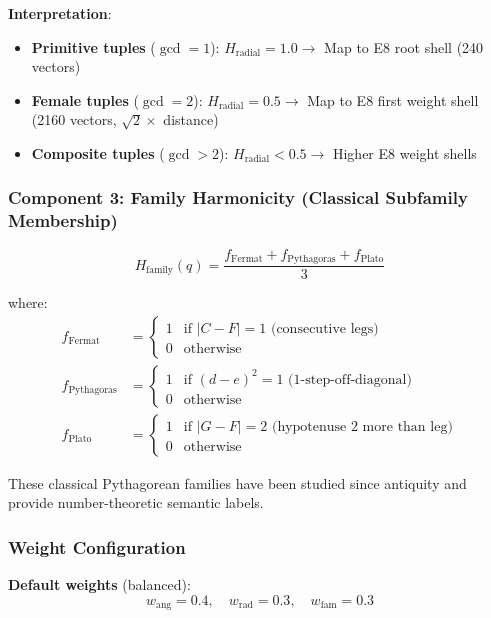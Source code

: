 \documentclass[11pt]{article}
\theoremstyle{remark}
\begin{document}
\textbf{Interpretation}:
\begin{itemize}
\item \textbf{Primitive tuples} ($\gcd=1$): $H_{\text{radial}} = 1.0 \to$ Map to E8 root shell (240 vectors)
\item \textbf{Female tuples} ($\gcd=2$): $H_{\text{radial}} = 0.5 \to$ Map to E8 first weight shell (2160 vectors, $\sqrt{2}\times$ distance)
\item \textbf{Composite tuples} ($\gcd>2$): $H_{\text{radial}} < 0.5 \to$ Higher E8 weight shells
\end{itemize}

\subsubsection{Component 3: Family Harmonicity (Classical Subfamily Membership)}

\begin{equation}
H_{\text{family}}(q) = \frac{f_{\text{Fermat}} + f_{\text{Pythagoras}} + f_{\text{Plato}}}{3}
\end{equation}

where:
\begin{align}
f_{\text{Fermat}} &= \begin{cases} 1 & \text{if } |C - F| = 1 \text{ (consecutive legs)} \\ 0 & \text{otherwise} \end{cases} \\
f_{\text{Pythagoras}} &= \begin{cases} 1 & \text{if } (d - e)^2 = 1 \text{ (1-step-off-diagonal)} \\ 0 & \text{otherwise} \end{cases} \\
f_{\text{Plato}} &= \begin{cases} 1 & \text{if } |G - F| = 2 \text{ (hypotenuse 2 more than leg)} \\ 0 & \text{otherwise} \end{cases}
\end{align}

These classical Pythagorean families have been studied since antiquity and provide number-theoretic semantic labels.

\subsubsection{Weight Configuration}

\textbf{Default weights} (balanced):
\begin{equation}
w_{\text{ang}} = 0.4, \quad w_{\text{rad}} = 0.3, \quad w_{\text{fam}} = 0.3
\end{equation}
\end{document}
